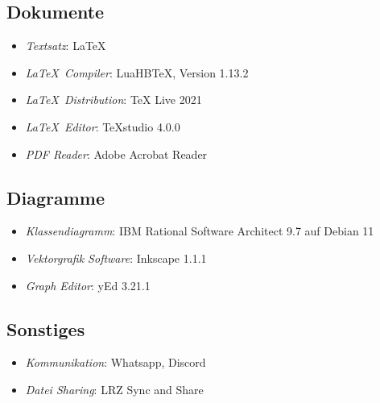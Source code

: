 \subsection{Dokumente}
\begin{itemize}
	\item \emph{Textsatz}: \LaTeX
	\item \emph{\LaTeX\ Compiler}: LuaHBTeX, Version 1.13.2
	\item \emph{\LaTeX\ Distribution}: TeX Live 2021
	\item \emph{\LaTeX\ Editor}: TeXstudio 4.0.0
	\item \emph{PDF Reader}: Adobe Acrobat Reader
\end{itemize}
\subsection{Diagramme}
\begin{itemize}
	\item \emph{Klassendiagramm}: IBM Rational Software Architect 9.7 auf Debian 11
	\item \emph{Vektorgrafik Software}: Inkscape 1.1.1
	\item \emph{Graph Editor}: yEd 3.21.1
\end{itemize}
\subsection{Sonstiges}
\begin{itemize}
	\item \emph{Kommunikation}: Whatsapp, Discord
	\item \emph{Datei Sharing}: LRZ Sync and Share
\end{itemize}